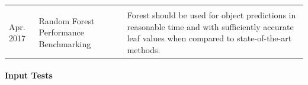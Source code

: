 \documentclass[12pt]{article}
\begin{document}
\begin{longtable}[]{@{}lll@{}}
\begin{minipage}[t]{0.22\columnwidth}
\end{minipage}\tabularnewline
\begin{minipage}[t]{0.06\columnwidth}\raggedright\strut
Apr. 2017\strut
\end{minipage} & \begin{minipage}[t]{0.16\columnwidth}\raggedright\strut
Random Forest Performance Benchmarking\strut
\end{minipage} & \begin{minipage}[t]{0.22\columnwidth}\raggedright\strut
Forest should be used for object predictions in reasonable time and with
sufficiently accurate leaf values when compared to state-of-the-art
methods.\strut
\end{minipage}\tabularnewline
\bottomrule
\end{longtable}

\paragraph{Input Tests}\label{input-tests}
\end{document}
